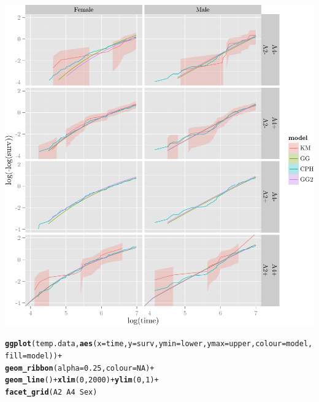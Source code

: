 \documentclass{article}\usepackage[]{graphicx}\usepackage[]{color}
\makeatletter
\def\maxwidth{ %
  \ifdim\Gin@nat@width>\linewidth
    \linewidth
  \else
    \Gin@nat@width
  \fi
}
\newcommand{\hlnum}[1]{\textcolor[rgb]{0.686,0.059,0.569}{#1}}%
\newcommand{\hlopt}[1]{\textcolor[rgb]{0,0,0}{#1}}%
\newcommand{\hlstd}[1]{\textcolor[rgb]{0.345,0.345,0.345}{#1}}%
\newcommand{\hlkwc}[1]{\textcolor[rgb]{0.333,0.667,0.333}{#1}}%
\newcommand{\hlkwd}[1]{\textcolor[rgb]{0.737,0.353,0.396}{\textbf{#1}}}%
\newenvironment{kframe}{%
 \def\at@end@of@kframe{}%
 \ifinner\ifhmode%
  \def\at@end@of@kframe{\end{minipage}}%
  \begin{minipage}{\columnwidth}%
 \fi\fi%
 \def\FrameCommand##1{\hskip\@totalleftmargin \hskip-\fboxsep
 \colorbox{shadecolor}{##1}\hskip-\fboxsep
     \hskip-\linewidth \hskip-\@totalleftmargin \hskip\columnwidth}%
 \MakeFramed {\advance\hsize-\width
   \@totalleftmargin\z@ \linewidth\hsize
   \@setminipage}}%
 {\par\unskip\endMakeFramed%
 \at@end@of@kframe}
\newenvironment{knitrout}{}{} %
\makeatother
\begin{document}
\begin{knitrout}
{\centering \includegraphics[width=\maxwidth]{figure/05-final-fit-assessment-3-1} 

}


\begin{kframe}\begin{alltt}
\hlkwd{ggplot}\hlstd{(temp.data,} \hlkwd{aes}\hlstd{(}\hlkwc{x} \hlstd{= time,} \hlkwc{y} \hlstd{= surv,} \hlkwc{ymin} \hlstd{= lower,} \hlkwc{ymax} \hlstd{= upper,} \hlkwc{colour} \hlstd{= model,} \hlkwc{fill} \hlstd{= model))} \hlopt{+}
        \hlkwd{geom_ribbon}\hlstd{(}\hlkwc{alpha} \hlstd{=} \hlnum{0.25}\hlstd{,} \hlkwc{colour} \hlstd{=} \hlnum{NA}\hlstd{)} \hlopt{+}
        \hlkwd{geom_line}\hlstd{()} \hlopt{+} \hlkwd{xlim}\hlstd{(}\hlnum{0}\hlstd{,} \hlnum{2000}\hlstd{)} \hlopt{+} \hlkwd{ylim}\hlstd{(}\hlnum{0}\hlstd{,} \hlnum{1}\hlstd{)} \hlopt{+}
        \hlkwd{facet_grid}\hlstd{(A2} \hlopt{~} \hlstd{A4} \hlopt{~} \hlstd{Sex)}
\end{alltt}


{\ttfamily\noindent\color{warningcolor}{\#\# Warning: Removed 3 rows containing missing values (geom\_path).}}

{\ttfamily\noindent\color{warningcolor}{\#\# Warning: Removed 3 rows containing missing values (geom\_path).}}

{\ttfamily\noindent\color{warningcolor}{\#\# Warning: Removed 2 rows containing missing values (geom\_path).}}


\end{kframe}
\end{knitrout}
\end{document}
